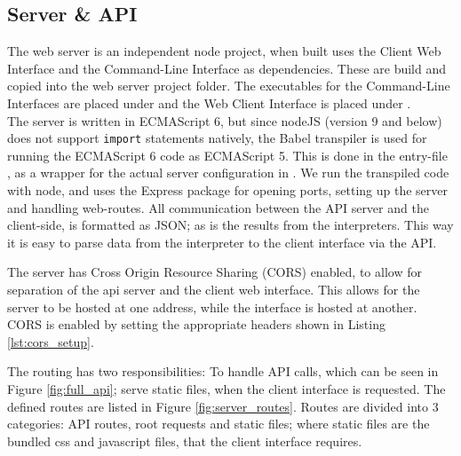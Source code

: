 



\subsection{Server \& API}

The web server is an independent node project, when built uses the Client Web Interface and the Command-Line Interface as dependencies.
These are build and copied into the web server project folder.
The executables for the Command-Line Interfaces are placed under  and the Web Client Interface is placed under .\\

\noindent
The server is written in ECMAScript 6, but since nodeJS (version 9 and below) does not support \texttt{import} statements natively, the Babel transpiler is used for running the ECMAScript 6 code as ECMAScript 5.
This is done in the entry-file , as a wrapper for the actual server configuration in .
We run the transpiled code with node, and uses the Express package for opening ports, setting up the server and handling web-routes.
All communication between the API server and the client-side, is formatted as JSON; as is the results from the interpreters.
This way it is easy to parse data from the interpreter to the client interface via the API.

The server has Cross Origin Resource Sharing (CORS) enabled, to allow for separation of the api server and the client web interface.
This allows for the server to be hosted at one address, while the interface is hosted at another.
CORS is enabled by setting the appropriate headers shown in Listing \ref{lst:cors_setup}.



The routing has two responsibilities: To handle API calls, which can be seen in Figure \ref{fig:full_api}; serve static files, when the client interface is requested. The defined routes are listed in Figure \ref{fig:server_routes}. Routes are divided into 3 categories: API routes, root requests and static files; where static files are the bundled css and javascript files, that the client interface requires.\\

